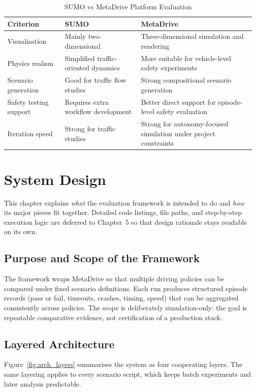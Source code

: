\documentclass[12pt,a4paper]{report}
\begin{document}
\begin{table}[H]
    \centering
    \caption{SUMO vs MetaDrive Platform Evaluation}
    \label{tab:sumo_vs_metadrive}
    \begin{tabularx}{\textwidth}{>{\raggedright\arraybackslash}p{3cm} X X}
        \toprule
        Criterion & SUMO & MetaDrive \\
        \midrule
        Visualisation & Mainly two-dimensional & Three-dimensional simulation and rendering \\
        Physics realism & Simplified traffic-oriented dynamics & More suitable for vehicle-level safety experiments \\
        Scenario generation & Good for traffic flow studies & Strong compositional scenario generation \\
        Safety testing support & Requires extra workflow development & Better direct support for episode-level safety evaluation \\
        Iteration speed & Strong for traffic studies & Strong for autonomy-focused simulation under project constraints \\
        \bottomrule
    \end{tabularx}
\end{table}

\chapter{System Design}

This chapter explains \emph{what} the evaluation framework is intended to do and \emph{how} its major pieces fit together. Detailed code listings, file paths, and step-by-step execution logic are deferred to Chapter~5 so that design rationale stays readable on its own.

\section{Purpose and Scope of the Framework}
The framework wraps MetaDrive \cite{metadrive,metadrive_docs} so that multiple driving policies can be compared under fixed scenario definitions. Each run produces structured episode records (pass or fail, timeouts, crashes, timing, speed) that can be aggregated consistently across policies. The scope is deliberately simulation-only: the goal is repeatable comparative evidence, not certification of a production stack.

\section{Layered Architecture}
Figure~\ref{fig:arch_layers} summarises the system as four cooperating layers. The same layering applies to every scenario script, which keeps batch experiments and later analysis predictable.
\end{document}

